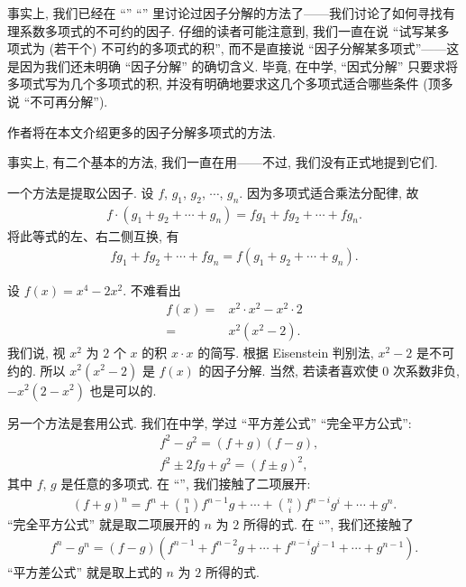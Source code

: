 事实上, 我们已经在 ``\RationalRootsOfPolynomialsOverQ '' ``\FactorsOfHigherDegreeOfPolynomialsOverQ '' 里讨论过因子分解的方法了——我们讨论了如何寻找有理系数多项式的不可约的因子. 仔细的读者可能注意到, 我们一直在说 ``试写某多项式为 (若干个) 不可约的多项式的积'', 而不是直接说 ``因子分解某多项式''——这是因为我们还未明确 ``因子分解'' 的确切含义. 毕竟, 在中学, ``因式分解'' 只要求将多项式写为几个多项式的积, 并没有明确地要求这几个多项式适合哪些条件 (顶多说 ``不可再分解'').

作者将在本文介绍更多的因子分解多项式的方法.

事实上, 有二个基本的方法, 我们一直在用——不过, 我们没有正式地提到它们.

一个方法是提取公因子. 设 $f$, $g_1$, $g_2$, $\cdots$, $g_n$. 因为多项式适合乘法分配律, 故
\begin{align*}
    f \cdot (g_1 + g_2 + \cdots + g_n) = fg_1 + fg_2 + \cdots + fg_n.
\end{align*}
将此等式的左、右二侧互换, 有
\begin{align*}
    fg_1 + fg_2 + \cdots + fg_n = f(g_1 + g_2 + \cdots + g_n).
\end{align*}

\begin{example}
    设 $f(x) = x^4 - 2x^2$. 不难看出
    \begin{align*}
        f(x)
        = {} & x^2 \cdot x^2 - x^2 \cdot 2 \\
        = {} & x^2 (x^2 - 2).
    \end{align*}
    我们说, 视 $x^2$ 为 $2$ 个 $x$ 的积 $x \cdot x$ 的简写. 根据 Eisenstein 判别法, $x^2 - 2$ 是不可约的. 所以 $x^2 (x^2 - 2)$ 是 $f(x)$ 的因子分解. 当然, 若读者喜欢使 $0$ 次系数非负, $-x^2 (2 - x^2)$ 也是可以的.
\end{example}

另一个方法是套用公式. 我们在中学, 学过 ``平方差公式'' ``完全平方公式'':
\begin{align*}
     & f^2 - g^2 = (f + g) (f - g),      \\
     & f^2 \pm 2 fg + g^2 = (f \pm g)^2,
\end{align*}
其中 $f$, $g$ 是任意的多项式. 在 ``\GeneralizedBinomialCoefficients '', 我们接触了二项展开:
\begin{align*}
    (f + g)^n = f^n + \binom{n}{1} f^{n-1} g + \cdots + \binom{n}{i} f^{n-i} g^i + \cdots + g^n.
\end{align*}
``完全平方公式'' 就是取二项展开的 $n$ 为 $2$ 所得的式. 在 ``\SyntheticDivision '', 我们还接触了
\begin{align*}
    f^n - g^n = (f - g)(f^{n-1} + f^{n-2} g + \cdots + f^{n-i} g^{i-1} + \cdots + g^{n-1}).
\end{align*}
``平方差公式'' 就是取上式的 $n$ 为 $2$ 所得的式.

